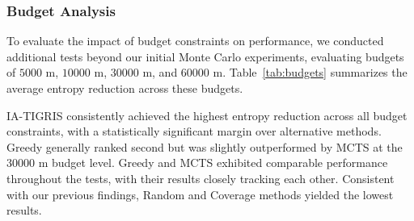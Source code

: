 

\subsubsection{Budget Analysis}
To evaluate the impact of budget constraints on performance, we conducted additional tests beyond our initial Monte Carlo experiments, evaluating budgets of $5000$ m, $10000$ m, $30000$ m, and $60000$ m. Table~\ref{tab:budgets} summarizes the average entropy reduction across these budgets.

\begin{table}[t]
    \centering
    \caption{Monte Carlo testing results given different budgets. The values are the average percent reduction in entropy and the 95\% confidence bounds. \mbox{IA-TIGRIS} had the best performance for all budgets.}
    \label{tab:budgets}
\end{table}

IA-TIGRIS consistently achieved the highest entropy reduction across all budget constraints, with a statistically significant margin over alternative methods. Greedy generally ranked second but was slightly outperformed by MCTS at the $30000$ m budget level. Greedy and MCTS exhibited comparable performance throughout the tests, with their results closely tracking each other. Consistent with our previous findings, Random and Coverage methods yielded the lowest results.


